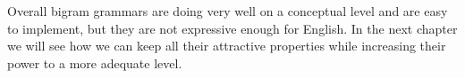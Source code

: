 Overall bigram grammars are doing very well on a conceptual level and are easy to implement, but they are not expressive enough for English.
In the next chapter we will see how we can keep all their attractive properties while increasing their power to a more adequate level.


